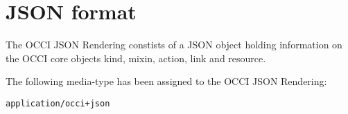 \documentclass[10pt,a4paper]{article}
\begin{document}
%
%
%
%
%
%

\section{JSON format}
\label{sec:json_format}
The OCCI JSON Rendering constists of a JSON object holding information on the OCCI core objects kind, mixin, action, link and resource.

The following media-type has been assigned to the OCCI JSON Rendering:

{\tt application/occi+json}


%
%
%
\end{document}
